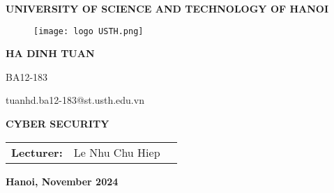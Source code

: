 \documentclass{article}
\begin{document}
\begin{center}
    \vspace{12pt} %
        \textbf{\fontsize{15pt}{0pt} \selectfont{} UNIVERSITY OF SCIENCE AND TECHNOLOGY OF HANOI}
    \vspace{0.5cm}

\begin{figure}[H]
    \centering
    \texttt{[image: logo USTH.png]}
\end{figure}

\vspace{48pt}
\vspace{24pt}

\vspace{18pt}

        \fontsize{14pt}{0pt}\selectfont{} \textbf{HA DINH TUAN}
    \vspace{3pt}

        \fontsize{14pt}{0pt}\selectfont{} BA12-183
    \vspace{3pt}

        \fontsize{12pt}{0pt}\selectfont{} tuanhd.ba12-183@st.usth.edu.vn
    \vspace{12pt} %

        \fontsize{14pt}{0pt}\selectfont{} \textbf{CYBER SECURITY} 

\end{center}
    \vspace{48pt}

\begin{table}[H]
    \centering
        \begin{tabular}{l l c}
            \textbf{Lecturer:}    &  Le Nhu Chu Hiep \vspace{6pt} &  \\
        \end{tabular}
\end{table}

\begin{center}
    \vspace{48pt}
    \fontsize{14pt}{0pt}\selectfont{} \textbf{Hanoi, November 2024}
\end{center}
\end{document}
